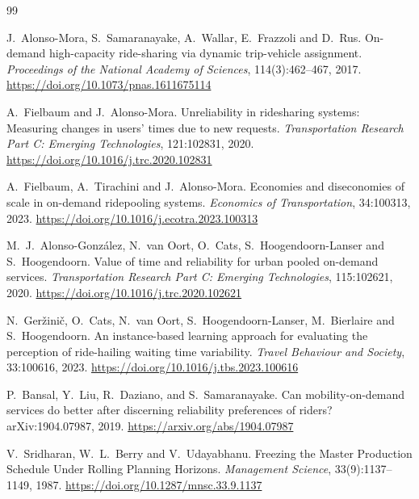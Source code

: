﻿\begin{thebibliography}{99}
\setlength{\itemsep}{5pt}

J.~Alonso-Mora, S.~Samaranayake, A.~Wallar, E.~Frazzoli and D.~Rus.
\newblock On-demand high-capacity ride-sharing via dynamic trip-vehicle assignment.
\newblock \emph{Proceedings of the National Academy of Sciences}, 114(3):462--467, 2017.
\newblock \url{https://doi.org/10.1073/pnas.1611675114}

A.~Fielbaum and J.~Alonso-Mora.
\newblock Unreliability in ridesharing systems: Measuring changes in users’ times due to new requests.
\newblock \emph{Transportation Research Part C: Emerging Technologies}, 121:102831, 2020.
\newblock \url{https://doi.org/10.1016/j.trc.2020.102831}

A.~Fielbaum, A.~Tirachini and J.~Alonso-Mora.
\newblock Economies and diseconomies of scale in on-demand ridepooling systems.
\newblock \emph{Economics of Transportation}, 34:100313, 2023.
\newblock \url{https://doi.org/10.1016/j.ecotra.2023.100313}

M.~J.~Alonso-González, N.~van Oort, O.~Cats, S.~Hoogendoorn-Lanser and S.~Hoogendoorn.
\newblock Value of time and reliability for urban pooled on-demand services.
\newblock \emph{Transportation Research Part C: Emerging Technologies}, 115:102621, 2020.
\newblock \url{https://doi.org/10.1016/j.trc.2020.102621}

N.~Geržinič, O.~Cats, N.~van Oort, S.~Hoogendoorn-Lanser, M.~Bierlaire and S.~Hoogendoorn.
\newblock An instance-based learning approach for evaluating the perception of ride-hailing waiting time variability.
\newblock \emph{Travel Behaviour and Society}, 33:100616, 2023.
\newblock \url{https://doi.org/10.1016/j.tbs.2023.100616}

P.~Bansal, Y.~Liu, R.~Daziano, and S.~Samaranayake.
\newblock Can mobility-on-demand services do better after discerning reliability preferences of
riders?
\newblock arXiv:1904.07987, 2019.
\newblock \url{https://arxiv.org/abs/1904.07987}

V.~Sridharan, W.~L.~Berry and V.~Udayabhanu.
\newblock Freezing the Master Production Schedule Under Rolling Planning Horizons.
\newblock \emph{Management Science}, 33(9):1137--1149, 1987.
\newblock \url{https://doi.org/10.1287/mnsc.33.9.1137}


\end{thebibliography}

